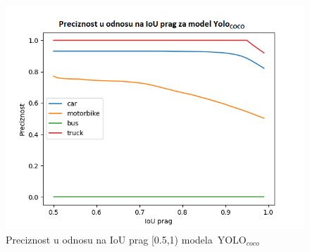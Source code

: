 \documentclass[12pt,oneside]{memoir}
\newcommand{\yolo}{\ensuremath{\,\textrm{YOLO}}}
\begin{document}
\begin{figure}[!ht]
    \centering
    \includegraphics[width=1\textwidth]{matfmaster/glava4/precision_vs_iou_threshold_yolo4.png}
    \caption{Preciznost u odnosu na IoU prag [0.5,1) modela $\yolo_{coco}$}
    \label{fig:section4_yolo4base_prc}
\end{figure}
\end{document}
